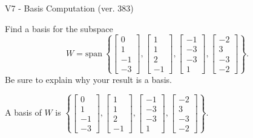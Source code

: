 \begin{exercise}
  \begin{exerciseTitle}V7 - Basis Computation (ver. 383)\end{exerciseTitle}
  \begin{exerciseStatement}
    Find a basis for the subspace 
\[W=\mathrm{span}\ \left\{\left[\begin{array}{r}
0 \\
1 \\
-1 \\
-3
\end{array}\right] , \left[\begin{array}{r}
1 \\
1 \\
2 \\
-1
\end{array}\right] , \left[\begin{array}{r}
-1 \\
-3 \\
-3 \\
1
\end{array}\right] , \left[\begin{array}{r}
-2 \\
3 \\
-3 \\
-2
\end{array}\right]\right\}.\]
 Be sure to explain why your result is a basis.


  \end{exerciseStatement}
  \begin{exerciseAnswer}
   A basis of \(W\) is  \(\left\{\left[\begin{array}{r}
0 \\
1 \\
-1 \\
-3
\end{array}\right] , \left[\begin{array}{r}
1 \\
1 \\
2 \\
-1
\end{array}\right] , \left[\begin{array}{r}
-1 \\
-3 \\
-3 \\
1
\end{array}\right] , \left[\begin{array}{r}
-2 \\
3 \\
-3 \\
-2
\end{array}\right]\right\}\).
  


  \end{exerciseAnswer}
\end{exercise}